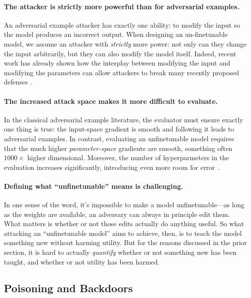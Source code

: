 \paragraph{The attacker is strictly more powerful than for adversarial examples.}
An adversarial example attacker has exactly one ability: to modify the input so the model produces an incorrect output.
When designing an un-finetunable model, we assume an attacker with \emph{strictly} more power: not only can they change the input arbitrarily, 
but they can also modify the model itself.
Indeed, recent work has already shown how the interplay between modifying the input and modifying the parameters can allow attackers to break many recently proposed defenses \cite{qi2024evaluating}.

\paragraph{The increased attack space makes it more difficult to evaluate.}
In the classical adversarial example literature, the evaluator must ensure exactly one thing is true: the input-space gradient is smooth and following it leads to adversarial examples.
In contrast, evaluating an unfinetunable model requires that the much higher \emph{parameter-space} gradients are smooth, something often $1000\times$ higher dimensional.
Moreover, the number of hyperparmeters in the evaluation increases significantly, introducing even more room for error~\citep{honig2024adversarial,qi2024evaluating}.

\paragraph{Defining what ``unfinetunable'' means is challenging.}
In one sense of the word, it's impossible to make a model unfinetunable---as long as the weights are available, an adversary can always in principle edit them.
What matters is whether or not those edits actually do anything useful.
So what attacking an ``unfinetunable model'' aims to achieve, then, is to teach the model something new without harming utility. %
But for the reasons discussed in the prior section, it is hard to actually \emph{quantify} whether or not something new has been taught, and whether or not utility has been harmed.


\subsection{Poisoning and Backdoors}
\label{sec:poisoning}

